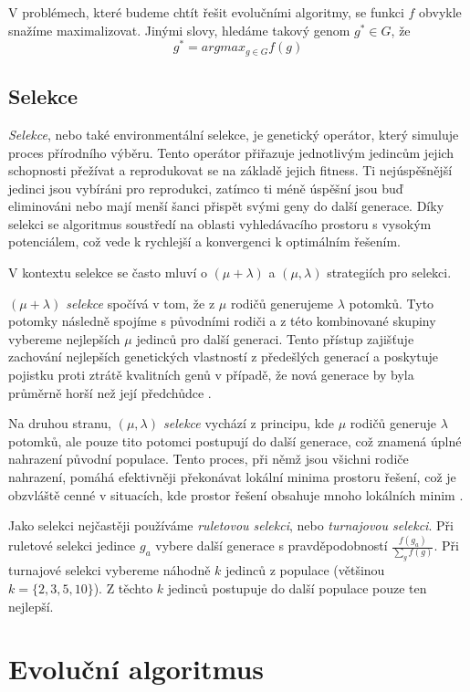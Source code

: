 V problémech, které budeme chtít řešit evolučními algoritmy, se funkci $f$ obvykle snažíme maximalizovat. Jinými slovy, hledáme takový genom $g^* \in G$, že 
$$g^* = argmax_{g \in G} f(g)$$

\subsection{Selekce}
\emph{Selekce}, nebo také environmentální selekce, je genetický operátor, který simuluje proces přírodního výběru. Tento operátor přiřazuje jednotlivým jedincům jejich schopnosti přežívat a reprodukovat se na základě jejich fitness. Ti nejúspěšnější jedinci jsou vybíráni pro reprodukci, zatímco ti méně úspěšní jsou buď eliminováni nebo mají menší šanci přispět svými geny do další generace. Díky selekci se algoritmus soustředí na oblasti vyhledávacího prostoru s vysokým potenciálem, což vede k rychlejší a konvergenci k optimálním řešením. 

V kontextu selekce se často mluví o $(\mu + \lambda)$ a $(\mu, \lambda)$ strategiích pro selekci. 

\emph{$(\mu + \lambda)$ selekce} spočívá v tom, že z $\mu$ rodičů generujeme $\lambda$ potomků. Tyto potomky následně spojíme s původními rodiči a z této kombinované skupiny vybereme nejlepších $\mu$ jedinců pro další generaci. Tento přístup zajišťuje zachování nejlepších genetických vlastností z předešlých generací a poskytuje pojistku proti ztrátě kvalitních genů v případě, že nová generace by byla průměrně horší než její předchůdce \cite{EibenSmith2015}.

Na druhou stranu, \emph{$(\mu, \lambda)$ selekce} vychází z principu, kde $\mu$ rodičů generuje $\lambda$ potomků, ale pouze tito potomci postupují do další generace, což znamená úplné nahrazení původní populace. Tento proces, při němž jsou všichni rodiče nahrazení, pomáhá efektivněji překonávat lokální minima prostoru řešení, což je obzvláště cenné v situacích, kde prostor řešení obsahuje mnoho lokálních minim \cite{EibenSmith2015}.

Jako selekci nejčastěji používáme \emph{ruletovou selekci}, nebo \emph{turnajovou selekci}. Při ruletové selekci jedince $g_a$ vybere další generace s pravděpodobností $\frac{f(g_a)}{\sum_g f(g)}$. Při turnajové selekci vybereme náhodně $k$ jedinců z populace (většinou $k = \{2,3,5,10\}$). Z těchto $k$ jedinců postupuje do další populace pouze ten nejlepší.

\section{Evoluční algoritmus}

